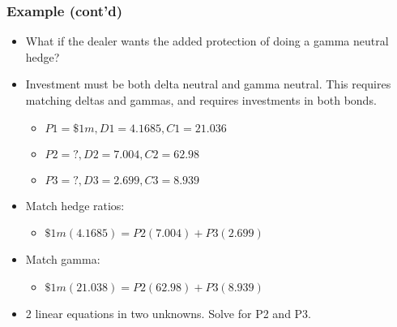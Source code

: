\documentclass[10pt]{beamer}
\begin{document}
\begin{frame}
	\frametitle{Example (cont'd)}
	
	\begin{itemize} \itemsep10pt
		\item What if the dealer wants the added protection of doing a gamma neutral hedge?
		
		\item Investment must be both delta neutral and gamma neutral. This requires matching deltas and gammas, and requires
		investments in both bonds.
		\begin{itemize}
			\item $P1 = \$1 m, D1 = 4.1685, C1 = 21.036$
			\item $P2 = ?, D2 = 7.004, C2 = 62.98$
			\item $P3 = ?, D3 = 2.699, C3 = 8.939$
		\end{itemize}
		
		\item Match hedge ratios:
		\begin{itemize}
			\item $ \$1m(4.1685) = P2(7.004) + P3(2.699)$
		\end{itemize}
		
		\item Match gamma:
		\begin{itemize}
			\item $ \$1m(21.038) = P2(62.98) + P3(8.939) $
		\end{itemize}
		
		\item 2 linear equations in two unknowns. Solve for P2 and P3.
		
	\end{itemize}
	
\end{frame}
\end{document}
